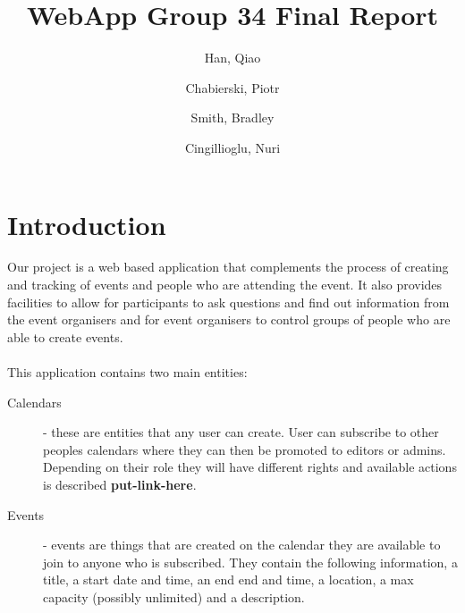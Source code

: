 \documentclass[10pt,a4paper]{article}
\begin{document}
\title{WebApp Group 34 Final Report}
\author{
  Han, Qiao\\
  \and
  Chabierski, Piotr\\
  \and
  Smith, Bradley\\
  \and
  Cingillioglu, Nuri\\
}

\maketitle

\section{Introduction}
Our project is a web based application that complements the process of creating and tracking of events and people who are attending the event. It also provides facilities to allow for participants to ask questions and find out information from the event organisers and for event organisers to control groups of people who are able to create events. 
\\
\\
\noindent This application contains two main entities:
\begin{description}
\item[Calendars] - these are entities that any user can create. User can subscribe to other peoples calendars where they can then be promoted to editors or admins. Depending on their role they will have different rights and available actions is described \textbf{put-link-here}.
\item[Events] - events are things that are created on the calendar they are available to join to anyone who is subscribed. They contain the following information, a title, a start date and time, an end end and time, a location, a max capacity (possibly unlimited) and a description.
\end{description}
\end{document}
